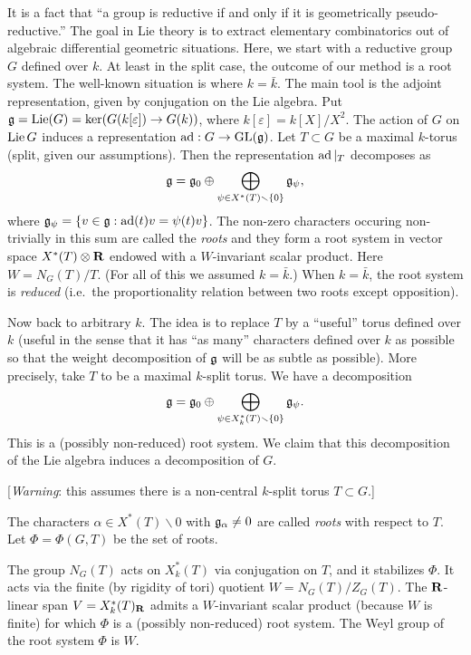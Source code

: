 It is a fact that ``a group is reductive if and only if it is geometrically 
pseudo-reductive.'' 
The goal in Lie theory is to extract elementary combinatorics out of 
algebraic differential geometric situations. Here, we start with a reductive 
group $G$ defined over $k$. At least in the split case, the outcome of our 
method is a root system. The well-known situation is where $k=\bar k$. 
The main tool is the adjoint representation, given by conjugation on the 
Lie algebra. Put 
$\mathfrak{g} = \operatorname{Lie}(G)=\ker(G(k[\varepsilon]) \to G(k))$, where $k[\varepsilon]=k[X]/X^2$. 
The action of $G$ on $\operatorname{Lie} G$ induces a representation 
$\operatorname{ad}:G\to \operatorname{GL}(\mathfrak{g})$. Let $T\subset G$ be a maximal 
$k$-torus (split, given our assumptions). Then the representation 
$\operatorname{ad}|_T$ decomposes as 
\[
  \mathfrak{g} = \mathfrak{g}_0 \oplus \bigoplus_{\psi\in X^\ast(T)\smallsetminus \{0\}} \mathfrak{g}_\psi ,
\]
where $\mathfrak{g}_\psi= \{v\in \mathfrak{g} :\operatorname{ad}(t) v = \psi(t) v\}$. The non-zero 
characters occuring non-trivially in this sum are called the 
\emph{roots} and they form a root system in vector space 
$X^\ast(T)\otimes \mathbf{R}$ endowed with a $W$-invariant scalar product. Here 
$W=N_G(T)/T$. (For all of this we assumed $k=\bar k$.) When 
$k=\bar k$, the root system is \emph{reduced} (i.e.\ the 
proportionality relation between two roots except opposition). 

Now back to arbitrary $k$. The idea is to replace $T$ by a ``useful'' torus 
defined over $k$ (useful in the sense that it has ``as many'' characters 
defined over $k$ as possible so that the weight decomposition of 
$\mathfrak{g}$ will be as subtle as possible). More precisely, take $T$ to be a 
maximal $k$-split torus. We have a decomposition 
\[
  \mathfrak{g} = \mathfrak{g}_0 \oplus \bigoplus_{\psi\in X_k^\ast(T)\smallsetminus \{0\}} \mathfrak{g}_\psi.
\]
This is a (possibly non-reduced) root system. We claim that this decomposition 
of the Lie algebra induces a decomposition of $G$. 

[\emph{Warning}: this assumes there is a non-central $k$-split torus $T\subset G$.]

The characters $\alpha\in X^\ast(T)\smallsetminus 0$ with $\mathfrak{g}_\alpha\ne 0$ are 
called \emph{roots} with respect to $T$. Let $\Phi=\Phi(G,T)$ be the set of 
roots. 

The group $N_G(T)$ acts on $X_k^\ast(T)$ via conjugation on $T$, and it stabilizes 
$\Phi$. It acts via the finite (by rigidity of tori) quotient 
$W=N_G(T)/Z_G(T)$. The $\mathbf{R}$-linear span $V=X_k^\ast(T)_{\mathbf{R}}$ admits a $W$-invariant 
scalar product (because $W$ is finite) for which $\Phi$ is a (possibly non-reduced) 
root system. The Weyl group of the root system $\Phi$ is $W$. 

